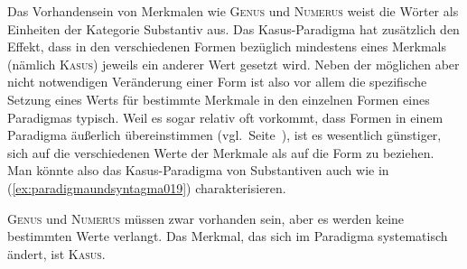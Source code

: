 \begin{exe}
  \ex\label{ex:paradigmaundsyntagma018}
  \begin{xlist}
  \end{xlist}
\end{exe}

Das Vorhandensein von Merkmalen wie \textsc{Genus} und \textsc{Numerus} weist die Wörter als Einheiten der Kategorie Substantiv aus.
Das Kasus-Paradigma hat zusätzlich den Effekt, dass in den verschiedenen Formen bezüglich mindestens eines Merkmals (nämlich \textsc{Kasus}) jeweils ein anderer Wert gesetzt wird.
Neben der möglichen aber nicht notwendigen Veränderung einer Form ist also vor allem die spezifische Setzung eines Werts für bestimmte Merkmale in den einzelnen Formen eines Paradigmas typisch.
Weil es sogar relativ oft vorkommt, dass Formen in einem Paradigma äußerlich übereinstimmen (vgl.\ Seite~\pageref{def:synkretismus}), ist es wesentlich günstiger, sich auf die verschiedenen Werte der Merkmale als auf die Form zu beziehen.
Man könnte also das Kasus-Paradigma von Substantiven auch wie in (\ref{ex:paradigmaundsyntagma019}) charakterisieren.


\begin{exe}
  \begin{xlist}
  \end{xlist}
\end{exe}

\textsc{Genus} und \textsc{Numerus} müssen zwar vorhanden sein, aber es werden keine bestimmten Werte verlangt.
Das Merkmal, das sich im Paradigma systematisch ändert, ist \textsc{Kasus}.

